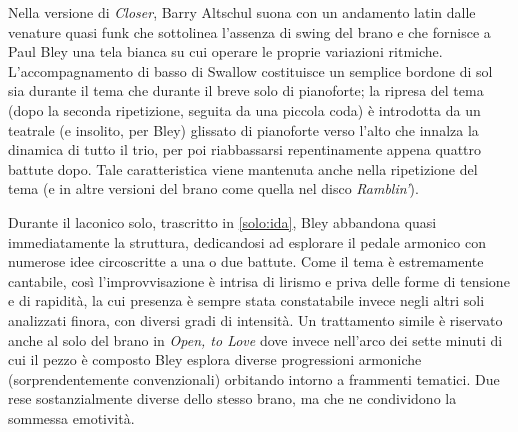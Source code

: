 Nella versione di \textit{Closer}, Barry Altschul suona con un andamento latin dalle venature quasi funk che sottolinea l'assenza di swing del brano e che fornisce a Paul Bley una tela bianca su cui operare le proprie variazioni ritmiche. L'accompagnamento di basso di Swallow costituisce un semplice bordone di sol sia durante il tema che durante il breve solo di pianoforte; la ripresa del tema (dopo la seconda ripetizione, seguita da una piccola coda) è introdotta da un teatrale (e insolito, per Bley) glissato di pianoforte verso l'alto che innalza la dinamica di tutto il trio, per poi riabbassarsi repentinamente appena quattro battute dopo. Tale caratteristica viene mantenuta anche nella ripetizione del tema (e in altre versioni del brano come quella nel disco \textit{Ramblin'}).\par
Durante il laconico solo, trascritto in \ref{solo:ida}, Bley abbandona quasi immediatamente la struttura, dedicandosi ad esplorare il pedale armonico con numerose idee circoscritte a una o due battute. Come il tema è estremamente cantabile, così l'improvvisazione è intrisa di lirismo e priva delle forme di tensione e di rapidità, la cui presenza è sempre stata constatabile invece negli altri soli analizzati finora, con diversi gradi di intensità. Un trattamento simile è riservato anche al solo del brano in \textit{Open, to Love} dove invece nell'arco dei sette minuti di cui il pezzo è composto Bley esplora diverse progressioni armoniche (sorprendentemente convenzionali) orbitando intorno a frammenti tematici. Due rese sostanzialmente diverse dello stesso brano, ma che ne condividono la sommessa emotività.

